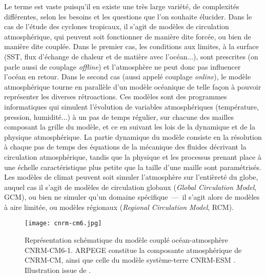 \documentclass[../main.tex]{subfiles}
\begin{document}
Le terme  est vaste puisqu'il en existe une très large variété, de complexités différentes, selon les besoins et les questions que
l'on souhaite élucider. Dans le cas de l'étude des cyclones tropicaux, il s'agit de modèles de circulation atmosphérique, qui peuvent soit fonctionner de
manière dite forcée, ou bien de manière dite couplée. Dans le premier cas, les conditions aux limites, à la surface (SST, flux d'échange de chaleur et de matière avec
l'océan...), sont prescrites (on parle aussi de couplage \textit{offline}) et l'atmosphère ne peut donc pas influencer l'océan en retour. Dans le second cas
(aussi appelé couplage \textit{online}), le modèle atmosphérique tourne en parallèle d'un modèle océanique de telle façon à pouvoir représenter les diverses
rétroactions. Ces modèles sont des programmes informatiques qui simulent l'évolution de variables atmosphériques (température, pression, humidité...) à un pas
de temps régulier, sur chacune des mailles composant la grille du modèle, et ce en suivant les lois de la dynamique et de la physique atmosphérique. La partie
dynamique du modèle consiste en la résolution à chaque pas de temps des équations de la mécanique des fluides décrivant la circulation atmosphérique, tandis que la
physique et les processus prenant place à une échelle caractéristique plus petite que la taille d'une maille sont paramétrisés. Les modèles de climat peuvent
soit simuler l'atmosphère sur l'entièreté du globe, auquel cas il s'agit de modèles de circulation globaux (\textit{Global Circulation Model}, GCM), ou bien ne
simuler qu'un domaine spécifique~---~il s'agit alors de modèles à aire limitée, ou modèles régionaux (\textit{Regional Circulation Model}, RCM).

\begin{figure}[t]
    \centering
    \texttt{[image: cnrm-cm6.jpg]}
    \caption{Représentation schématique du modèle couplé océan-atmosphère CNRM-CM6-1. \hbox{ARPEGE} constitue la composante atmosphérique de CNRM-CM, ainsi que
    celle du modèle système-terre CNRM-ESM \parencite{seferian_evaluation_2019}. Illustration issue de \cite{voldoire_evaluation_2019}.}
    \label{fig:cnrm-cm6}
\end{figure}
\end{document}
